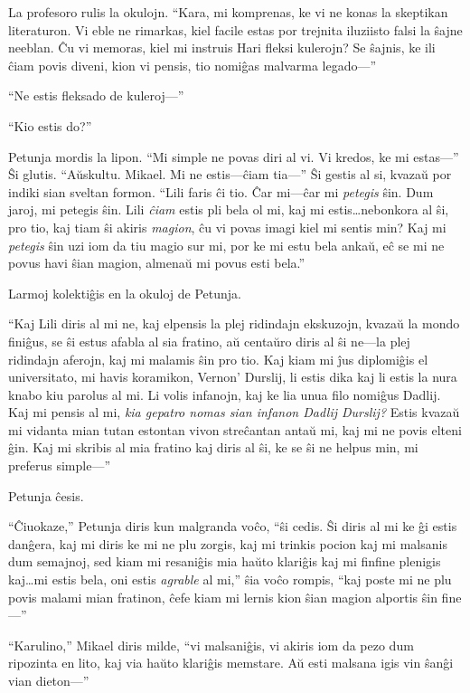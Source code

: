La profesoro rulis la okulojn.
“Kara, mi komprenas, ke vi ne konas la skeptikan literaturon.
Vi eble ne rimarkas, kiel facile estas por trejnita iluziisto falsi la ŝajne neeblan.
Ĉu vi memoras, kiel mi instruis Hari fleksi kulerojn?
Se ŝajnis, ke ili ĉiam povis diveni, kion vi pensis, tio nomiĝas malvarma legado—”

“Ne estis fleksado de kuleroj—”

“Kio estis do?”

Petunja mordis la lipon.
“Mi simple ne povas diri al vi.
Vi kredos, ke mi estas—”
Ŝi glutis.
“Aŭskultu.
Mikael.
Mi ne estis—ĉiam tia—”
Ŝi gestis al si, kvazaŭ por indiki sian sveltan formon.
“Lili faris ĉi tio.
Ĉar mi—ĉar mi \emph{petegis} ŝin.
Dum jaroj, mi petegis ŝin.
Lili \emph{ĉiam} estis pli bela ol mi, kaj mi estis…nebonkora al ŝi, pro tio, kaj tiam ŝi akiris \emph{magion}, ĉu vi povas imagi kiel mi sentis min?
Kaj mi \emph{petegis} ŝin uzi iom da tiu magio sur mi, por ke mi estu bela ankaŭ, eĉ se mi ne povus havi ŝian magion, almenaŭ mi povus esti bela.”

Larmoj kolektiĝis en la okuloj de Petunja.

“Kaj Lili diris al mi ne, kaj elpensis la plej ridindajn ekskuzojn, kvazaŭ la mondo finiĝus, se ŝi estus afabla al sia fratino, aŭ centaŭro diris al ŝi ne—la plej ridindajn aferojn, kaj mi malamis ŝin pro tio.
Kaj kiam mi ĵus diplomiĝis el universitato, mi havis koramikon, Vernon’ Durslij, li estis dika kaj li estis la nura knabo kiu parolus al mi.
Li volis infanojn, kaj ke lia unua filo nomiĝus Dadlij.
Kaj mi pensis al mi, \emph{kia gepatro nomas sian infanon Dadlij Durslij?}
Estis kvazaŭ mi vidanta mian tutan estontan vivon streĉantan antaŭ mi, kaj mi ne povis elteni ĝin.
Kaj mi skribis al mia fratino kaj diris al ŝi, ke se ŝi ne helpus min, mi preferus simple—”

Petunja ĉesis.

“Ĉiuokaze,” Petunja diris kun malgranda voĉo, “ŝi cedis.
Ŝi diris al mi ke ĝi estis danĝera, kaj mi diris ke mi ne plu zorgis, kaj mi trinkis pocion kaj mi malsanis dum semajnoj, sed kiam mi resaniĝis mia haŭto klariĝis kaj mi finfine plenigis kaj…mi estis bela, oni estis \emph{agrable} al mi,” ŝia voĉo rompis, “kaj poste mi ne plu povis malami mian fratinon, ĉefe kiam mi lernis kion ŝian magion alportis ŝin fine—”

“Karulino,” Mikael diris milde, “vi malsaniĝis, vi akiris iom da pezo dum ripozinta en lito, kaj via haŭto klariĝis memstare.
Aŭ esti malsana igis vin ŝanĝi vian dieton—”

